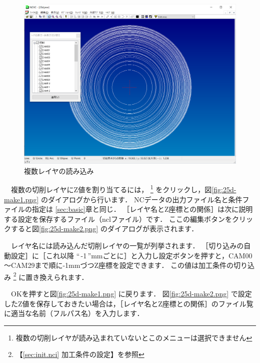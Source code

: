 \begin{figure}[H]
\centering
\includegraphics[scale=0.55]{No3/fig/25d-read.png}
\caption{複数レイヤの読み込み}
\label{fig:25d-read.png}
\end{figure}

　複数の切削レイヤにZ値を割り当てるには，
\footnote{複数の切削レイヤが読み込まれていないとこのメニューは選択できません}
をクリックし，図\ref{fig:25d-make1.png} のダイアログから行います．
NCデータの出力ファイル名と条件ファイルの指定は \ref{sec:basic}章と同じ．
［レイヤ名とZ座標との関係］は次に説明する設定を保存するファイル（nclファイル）です．
ここの編集ボタンをクリックすると図\ref{fig:25d-make2.png} のダイアログが表示されます．

　レイヤ名には読み込んだ切削レイヤの一覧が列挙されます．
［切り込みの自動設定］に［これ以降 ``\,-1\,''mmごとに］と入力し設定ボタンを押すと，CAM00～CAM29まで順に-1mmづつZ座標を設定できます．
この値は加工条件の切り込み
\footnote{【\ref{sec:init.nci} 加工条件の設定】を参照}
に置き換えられます．

　OKを押すと図\ref{fig:25d-make1.png} に戻ります．
図\ref{fig:25d-make2.png} で設定したZ値を保存しておきたい場合は，［レイヤ名とZ座標との関係］のファイル覧に適当な名前（フルパス名）を入力します．

